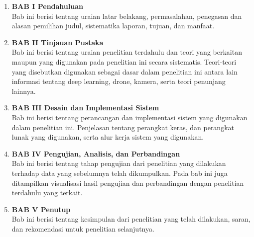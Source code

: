 \begin{enumerate}
    \item \textbf{BAB I Pendahuluan} \\
    Bab ini berisi tentang uraian latar belakang, permasalahan, penegasan dan alasan pemilihan judul, sistematika laporan, tujuan, dan manfaat.
    
    \item \textbf{BAB II Tinjauan Pustaka} \\
    Bab ini berisi tentang uraian penelitian terdahulu dan teori yang berkaitan maupun yang digunakan pada penelitian ini secara sistematis. Teori-teori yang disebutkan digunakan sebagai dasar dalam penelitian ini antara lain informasi tentang deep learning, drone, kamera, serta teori penunjang lainnya.
    
    \item \textbf{BAB III Desain dan Implementasi Sistem} \\
    Bab ini berisi tentang perancangan dan implementasi sistem yang digunakan dalam penelitian ini. Penjelasan tentang perangkat keras, dan perangkat lunak yang digunakan, serta alur kerja sistem yang digunakan.
    
    \item \textbf{BAB IV Pengujian, Analisis, dan Perbandingan} \\
    Bab ini berisi tentang tahap pengujian dari penelitian yang dilakukan terhadap data yang sebelumnya telah dikumpulkan. Pada bab ini juga ditampilkan visualisasi hasil pengujian dan perbandingan dengan penelitian terdahulu yang terkait.
    
    \item \textbf{BAB V Penutup} \\
    Bab ini berisi tentang kesimpulan dari penelitian yang telah dilakukan, saran, dan rekomendasi untuk penelitian selanjutnya.
\end{enumerate}

